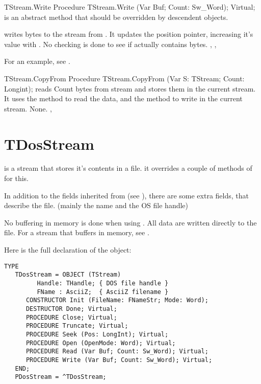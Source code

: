 

\begin{procedure}{TStream.Write}
\Declaration
Procedure TStream.Write (Var Buf; Count: Sw\_Word); Virtual;
\Description
{} is an abstract method that should be overridden by descendent
objects.

 writes  bytes to the stream from .
It updates the position pointer, increasing it's value with . 
\Errors
No checking is done to see if  actually contains  bytes. 
\SeeAlso
{}, ,
\end{procedure}

For an example, see .

\begin{procedure}{TStream.CopyFrom}
\Declaration
Procedure TStream.CopyFrom (Var S: TStream; Count: Longint);
\Description
{} reads Count bytes from stream  and stores them
in the current stream. It uses the  method
to read the data, and the  method to
write in the current stream.
\Errors
None.
\SeeAlso
{}, 
\end{procedure}



\section{TDosStream}
\label{se:TDosStream}

 is a stream that stores it's contents in a file.
it overrides a couple of methods of  for this.

In addition to the fields inherited from  (see ),
there are some extra fields, that describe the file. (mainly the name and
the OS file handle)

No buffering in memory is done when using . 
All data are written directly to the file. For a stream that buffers 
in memory, see .

Here is the full declaration of the  object:
\begin{verbatim}
TYPE
   TDosStream = OBJECT (TStream)
         Handle: THandle; { DOS file handle }
         FName : AsciiZ;  { AsciiZ filename }
      CONSTRUCTOR Init (FileName: FNameStr; Mode: Word);
      DESTRUCTOR Done; Virtual;
      PROCEDURE Close; Virtual;
      PROCEDURE Truncate; Virtual;
      PROCEDURE Seek (Pos: LongInt); Virtual;
      PROCEDURE Open (OpenMode: Word); Virtual;
      PROCEDURE Read (Var Buf; Count: Sw_Word); Virtual;
      PROCEDURE Write (Var Buf; Count: Sw_Word); Virtual;
   END;
   PDosStream = ^TDosStream;
\end{verbatim}


